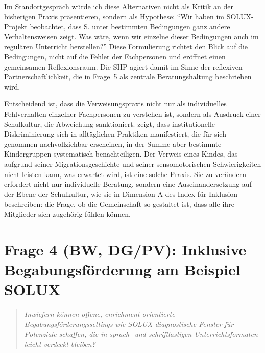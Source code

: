 \documentclass[ngerman, a4paper]{article}
\begin{document}
Im Standortgespräch würde ich diese Alternativen nicht als Kritik an der
bisherigen Praxis präsentieren, sondern als Hypothese: \enquote{Wir haben im
SOLUX-Projekt beobachtet, dass S. unter bestimmten Bedingungen ganz andere
Verhaltensweisen zeigt. Was wäre, wenn wir einzelne dieser Bedingungen auch
im regulären Unterricht herstellen?} Diese Formulierung richtet den Blick
auf die Bedingungen, nicht auf die Fehler der Fachpersonen und eröffnet einen
gemeinsamen Reflexionsraum. Die SHP agiert damit im Sinne der reflexiven
Partnerschaftlichkeit, die in Frage~5 als zentrale Beratungshaltung
beschrieben wird.

Entscheidend ist, dass die Verweisungspraxis nicht nur als individuelles
Fehlverhalten einzelner Fachpersonen zu verstehen ist, sondern als Ausdruck
einer Schulkultur, die Abweichung sanktioniert. \textcite[S.\,63--77]{kappus2010migration} zeigt, dass
institutionelle Diskriminierung sich in alltäglichen Praktiken manifestiert,
die für sich genommen nachvollziehbar erscheinen, in der Summe aber bestimmte
Kindergruppen systematisch benachteiligen. Der
Verweis eines Kindes, das aufgrund seiner Migrationsgeschichte und seiner
sensomotorischen Schwierigkeiten nicht leisten kann, was erwartet wird, ist
eine solche Praxis. Sie zu verändern erfordert nicht nur individuelle
Beratung, sondern eine Auseinandersetzung auf der Ebene der Schulkultur,
wie sie \textcite[Dim.\,A]{booth2019index} in Dimension A des Index für Inklusion beschreiben:
die Frage, ob die Gemeinschaft so gestaltet ist, dass alle ihre Mitglieder
sich zugehörig fühlen können.


\section{Frage 4 (BW, DG/PV): Inklusive Begabungsförderung am Beispiel SOLUX}
\label{sec:frage4}
 
\begin{quote}\itshape
Inwiefern können offene, enrichment-orientierte Begabungsförderungssettings
wie SOLUX diagnostische Fenster für Potenziale schaffen, die in sprach-
und schriftlastigen Unterrichtsformaten leicht verdeckt bleiben?
\end{quote}
\end{document}

